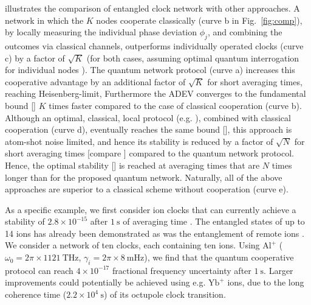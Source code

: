   illustrates the comparison of entangled clock network with
other approaches.
A network in which the $K$ nodes cooperate classically (curve b in
Fig.~\ref{fig:comp}), by locally measuring the individual phase deviation
$\phi_j$, and combining the outcomes via classical channels, outperforms
individually operated clocks (curve c) by a factor of $\sqrt K$ 
(for both cases, assuming optimal
quantum interrogation for individual nodes
\cite{Kessler2014,Borregaard2013_nearHeisenberg}).
The quantum network protocol (curve a)
increases this cooperative advantage by an additional factor of $\sqrt K$ for
short averaging times, reaching Heisenberg-limit, Furthermore the ADEV
converges to the fundamental bound [] $K$ times faster compared
to the case of classical cooperation (curve b).
Although an optimal, classical, local protocol
(e.g. \cite{Rosenband2013, Borregaard2013}), combined with classical
cooperation (curve d), eventually reaches the same
bound [],
this approach is atom-shot noise limited, and hence its stability is reduced by
a factor of  $\sqrt N$ for short averaging times [compare ]
compared to the quantum network protocol.  Hence, the optimal stability
[] is reached at averaging times that are $N$ times longer
than for the proposed quantum network. Naturally, all of the above approaches
are superior to a classical scheme without cooperation (curve e).

As a specific example, we first consider ion clocks that can currently achieve a
stability of $2.8\times 10^{-15}$ after $1~\mathrm{s}$ of averaging time
\cite{Chou2010}. The entangled states of up to 14 ions has already been
demonstrated \cite{Monz2011} as was the entanglement of remote ions
\cite{Maunz2007}. We consider a network of ten clocks, each containing ten ions.
Using $\mathrm{Al}^+$ ($\omega_0 = 2\pi \times 1121~\mathrm{THz}$, $\gamma_i = 2\pi
\times 8~\mathrm{mHz}$), we find that the quantum cooperative protocol can reach
$4\times 10^{-17}$ fractional frequency uncertainty after $1~\mathrm{s}$. Larger
improvements could potentially be achieved using e.g. $\mathrm{Yb}^+$ ions, due to the long coherence time ($2.2\times
10^4~\mathrm{s}$) of its octupole clock transition.

